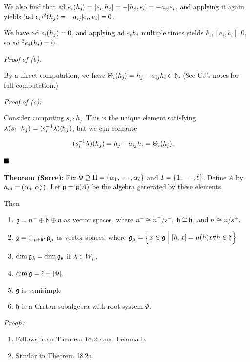 We also find that
\(\mathrm{ad}~ e_i (h_j) = [e_i, h_j] = -[h_j, e_i] = -a_{ij} e_i\), and applying
it again yields \((\mathrm{ad}~ e_i)^2(h_j) = -a_{ij}[e_i, e_i] = 0\).

We have \(\mathrm{ad}~ e_i (h_j) = 0\), and applying \(\mathrm{ad}~ e_i h_i\) multiple
times yields \(h_i, [e_i, h_i], 0\), so \(\mathrm{ad}~^{3} e_i(h_i) = 0\).

\emph{Proof of (b):}

By a direct computation, we have
\(\Theta_i(h_j) = h_j - a_{ij} h_i \in {\mathfrak{h}}\). (See CJ's notes for full
computation.)

\emph{Proof of (c):}

Consider computing \(s_i \cdot h_j\). This is the unique element
satisfying \(\lambda(s_i \cdot h_j) = (s_i^{-1} \lambda)(h_j)\), but we
can compute

\begin{align*}
(s_i^{-1} \lambda) (h_j) &= h_j - a_{ij} h_i = \Theta_i(h_j)
.\end{align*}

\(\qed\)

\textbf{Theorem (Serre):} Fix
\(\Phi \supseteq \Pi = \left\{{\alpha_1, \cdots, \alpha_\ell}\right\}\) and
\(I = \left\{{1, \cdots, \ell}\right\}\). Define \(A\) by
\(a_{ij} = (\alpha_j, \alpha_i^\vee)\). Let \({\mathfrak{g}} = {\mathfrak{g}}(A)\) be the
algebra generated by these elements.

Then

\begin{enumerate}
\def\labelenumi{\alph{enumi}.}
\tightlist
\item
  \({\mathfrak{g}} = n^- \oplus {\mathfrak{h}} \oplus n\) as vector spaces, where
  \(n^- \cong \tilde n^- / s^-\), \({\mathfrak{h}} \cong \tilde{{\mathfrak{h}}}\), and
  \(n \cong \tilde n / s^+\).
\item
  \({\mathfrak{g}} = \oplus_{\mu \in {\mathfrak{h}}^*} {\mathfrak{g}}_\mu\) as vector spaces, where
  \({\mathfrak{g}}_\mu = \left\{{x\in{\mathfrak{g}} {~\mathrel{\Big|}~} [h, x] = \mu(h) x \forall h\in {\mathfrak{h}}}\right\}\)
\item
  \(\dim {\mathfrak{g}}_\lambda = \dim {\mathfrak{g}}_\mu\) if \(\lambda \in W_\mu\),
\item
  \(\dim {\mathfrak{g}} = \ell + {\left\lvert {\Phi} \right\rvert}\),
\item
  \({\mathfrak{g}}\) is semisimple,
\item
  \({\mathfrak{h}}\) is a Cartan subalgebra with root system \(\Phi\).
\end{enumerate}

\emph{Proofs:}

\begin{enumerate}
\def\labelenumi{\alph{enumi}.}
\tightlist
\item
  Follows from Theorem 18.2b and Lemma b.
\item
  Similar to Theorem 18.2a.
\end{enumerate}

